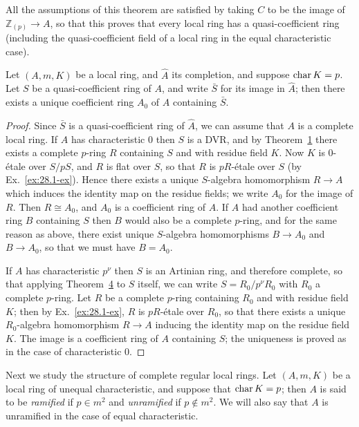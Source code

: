 All the assumptions of this theorem are satisfied by taking $C$ to be the image
of $\mathbb{Z}_{(p)} \to A$, so that this proves that every local ring has a quasi-coefficient
ring (including the quasi-coefficient field of a local ring in the equal
characteristic case).

\begin{theorem}\label{thm:29.7}
Let $(A, m, K)$ be a local ring, and $\hat{A}$ its completion, and suppose
$\operatorname{char} K = p$. Let $S$ be a quasi-coefficient ring of $A$, and write $\bar{S}$ for its
image in $\hat{A}$; then there exists a unique coefficient ring $A_0$ of $\hat{A}$
containing $\bar{S}$.
\end{theorem}

\begin{proof}
Since $\bar{S}$ is a quasi-coefficient ring of $\hat{A}$, we can assume that $A$ is a
complete local ring. If $A$ has characteristic $0$ then $S$ is a DVR, and by
Theorem~\hyperref[thm:29.1]{1} there exists a complete $p$-ring $R$ containing $S$ and with
residue field $K$. Now $K$ is 0-\'etale over $S/pS$, and $R$ is flat over $S$, so that
$R$ is $pR$-\'etale over $S$ (by Ex.~\ref{ex:28.1-ex}). Hence there exists a unique
$S$-algebra homomorphism $R \to A$ which induces the identity map on the residue
fields; we write $A_0$ for the image of $R$. Then $R \cong A_0$, and $A_0$ is a
coefficient ring of $A$. If $A$ had another coefficient ring $B$ containing $S$ then
$B$ would also be a complete $p$-ring, and for the same reason as above, there
exist unique $S$-algebra homomorphisms $B \to A_0$ and $B \to A_0$, so that we must
have $B = A_0$.

If $A$ has characteristic $p^\nu$ then $S$ is an Artinian ring, and therefore
complete, so that applying Theorem~\hyperref[thm:29.4]{4} to $S$ itself, we can write
$S = R_0/p^\nu R_0$ with $R_0$ a complete $p$-ring. Let $R$ be a complete $p$-ring
containing $R_0$ and with residue field $K$; then by Ex.~\ref{ex:28.1-ex}, $R$ is $pR$-\'etale
over $R_0$, so that there exists a unique $R_0$-algebra homomorphism $R \to A$
inducing the identity map on the residue field $K$. The image is a coefficient
ring of $A$ containing $S$; the uniqueness is proved as in the case of
characteristic $0$.
\end{proof}

Next we study the structure of complete regular local rings. Let $(A, m, K)$ be a
local ring of unequal characteristic, and suppose that $\operatorname{char} K = p$; then $A$ is
said to be \emph{ramified} if $p \in m^2$ and \emph{unramified} if $p \notin m^2$. We will
also say that $A$ is unramified in the case of equal characteristic.

